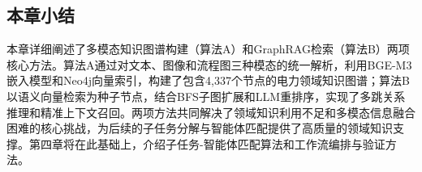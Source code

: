 \subsection{本章小结}

本章详细阐述了多模态知识图谱构建（算法A）和GraphRAG检索（算法B）两项核心方法。算法A通过对文本、图像和流程图三种模态的统一解析，利用BGE-M3嵌入模型和Neo4j向量索引，构建了包含4,337个节点的电力领域知识图谱；算法B以语义向量检索为种子节点，结合BFS子图扩展和LLM重排序，实现了多跳关系推理和精准上下文召回。两项方法共同解决了领域知识利用不足和多模态信息融合困难的核心挑战，为后续的子任务分解与智能体匹配提供了高质量的领域知识支撑。第四章将在此基础上，介绍子任务-智能体匹配算法和工作流编排与验证方法。
